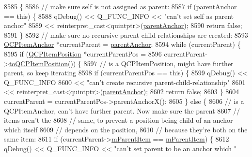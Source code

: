 \begin{DoxyCode}
8585                                                                \{
8586   \textcolor{comment}{// make sure self is not assigned as parent:}
8587   \textcolor{keywordflow}{if} (parentAnchor == \textcolor{keyword}{this}) \{
8588     qDebug() << Q\_FUNC\_INFO << \textcolor{stringliteral}{"can't set self as parent anchor"}
8589              << \textcolor{keyword}{reinterpret\_cast<}quintptr\textcolor{keyword}{>}(\hyperlink{class_q_c_p_item_position_a7b4ffab9946945c0e11cd2352dc2e042}{parentAnchor});
8590     \textcolor{keywordflow}{return} \textcolor{keyword}{false};
8591   \}
8592   \textcolor{comment}{// make sure no recursive parent-child-relationships are created:}
8593   \hyperlink{class_q_c_p_item_anchor}{QCPItemAnchor} *currentParent = \hyperlink{class_q_c_p_item_position_a7b4ffab9946945c0e11cd2352dc2e042}{parentAnchor};
8594   \textcolor{keywordflow}{while} (currentParent) \{
8595     \textcolor{keywordflow}{if} (\hyperlink{class_q_c_p_item_position}{QCPItemPosition} *currentParentPos =
8596             currentParent->\hyperlink{class_q_c_p_item_anchor_ac54b20120669950255a63587193dbb86}{toQCPItemPosition}()) \{
8597       \textcolor{comment}{// is a QCPItemPosition, might have further parent, so keep iterating}
8598       \textcolor{keywordflow}{if} (currentParentPos == \textcolor{keyword}{this}) \{
8599         qDebug() << Q\_FUNC\_INFO
8600                  << \textcolor{stringliteral}{"can't create recursive parent-child-relationship"}
8601                  << \textcolor{keyword}{reinterpret\_cast<}quintptr\textcolor{keyword}{>}(\hyperlink{class_q_c_p_item_position_a7b4ffab9946945c0e11cd2352dc2e042}{parentAnchor});
8602         \textcolor{keywordflow}{return} \textcolor{keyword}{false};
8603       \}
8604       currentParent = currentParentPos->parentAnchorX();
8605     \} \textcolor{keywordflow}{else} \{
8606       \textcolor{comment}{// is a QCPItemAnchor, can't have further parent. Now make sure the parent}
8607       \textcolor{comment}{// items aren't the}
8608       \textcolor{comment}{// same, to prevent a position being child of an anchor which itself}
8609       \textcolor{comment}{// depends on the position,}
8610       \textcolor{comment}{// because they're both on the same item:}
8611       \textcolor{keywordflow}{if} (currentParent->\hyperlink{class_q_c_p_item_anchor_a80fad480ad3bb980446ed6ebc00818ae}{mParentItem} == \hyperlink{class_q_c_p_item_anchor_a80fad480ad3bb980446ed6ebc00818ae}{mParentItem}) \{
8612         qDebug() << Q\_FUNC\_INFO << \textcolor{stringliteral}{"can't set parent to be an anchor which "}

\end{DoxyCode}

